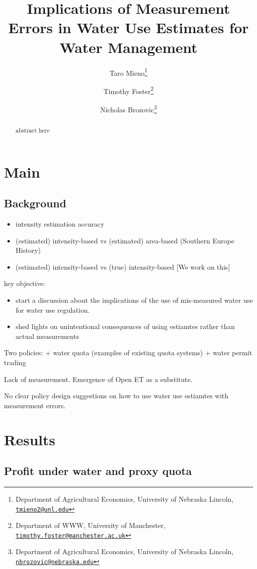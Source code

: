 \documentclass[
]{article}
\title{Implications of Measurement Errors in Water Use Estimates for Water Management}
\author{Taro Mieno\footnote{Department of Agricultural Economics, University of Nebraska Lincoln, \href{mailto:tmieno2@unl.edu}{\nolinkurl{tmieno2@unl.edu}}} \and Timothy Foster\footnote{Department of WWW, University of Manchester, \href{mailto:timothy.foster@manchester.ac.uk}{\nolinkurl{timothy.foster@manchester.ac.uk}}} \and Nicholas Brozovic\footnote{Department of Agricultural Economics, University of Nebraska Lincoln, \href{mailto:nbrozovic@nebraska.edu}{\nolinkurl{nbrozovic@nebraska.edu}}}}
\date{}
\providecommand{\tightlist}{%
  \setlength{\itemsep}{0pt}\setlength{\parskip}{0pt}}
\begin{document}
\maketitle
\begin{abstract}
abstract here
\end{abstract}

\hypertarget{main}{%
\section{Main}\label{main}}

\hypertarget{background}{%
\subsection{Background}\label{background}}

\begin{itemize}
\tightlist
\item
  intensity estimation accuracy
\item
  (estimated) intensity-based vs (estimated) area-based (Southern Europe History)
\item
  (estimated) intensity-based vs (true) intensity-based {[}We work on this{]}
\end{itemize}

key objective:

\begin{itemize}
\item
  start a discussion about the implications of the use of mis-measured water use for water use regulation.
\item
  shed lights on unintentional consequences of using estiamtes rather than actual measurements
\end{itemize}

Two policies:
+ water quota (examples of existing quota systems)
+ water permit trading

Lack of measurement. Emergence of Open ET as a substitute.

No clear policy design suggestions on how to use water use estiamtes with measurement errors.

\hypertarget{results}{%
\section{Results}\label{results}}

\hypertarget{profit-under-water-and-proxy-quota}{%
\subsection{Profit under water and proxy quota}\label{profit-under-water-and-proxy-quota}}
\end{document}

